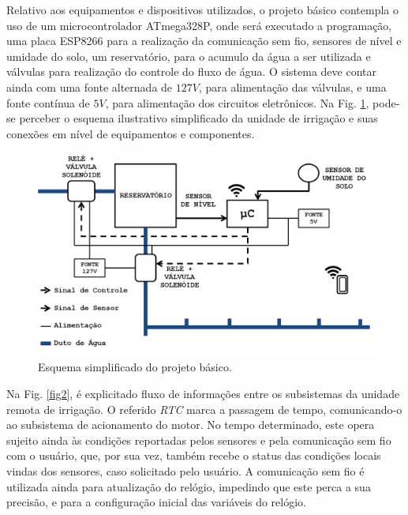 \documentclass[conference]{IEEEtran}
\begin{document}
Relativo aos equipamentos e dispositivos utilizados, o projeto básico contempla o uso de um microcontrolador ATmega328P,  onde será executado a programação, uma placa ESP8266 para a realização da comunicação sem fio, sensores de nível e umidade do solo, um reservatório, para o acumulo da água a ser utilizada e válvulas para realização do controle do fluxo de água. O sistema deve contar ainda com uma fonte alternada de $127 V$, para alimentação das válvulas, e uma fonte contínua de $5 V$, para alimentação dos circuitos eletrônicos. Na Fig. \ref{fig1}, pode-se perceber o esquema ilustrativo simplificado da unidade de irrigação e suas conexões em nível de equipamentos e componentes.

\begin{figure}[htbp]
\centerline{\includegraphics[angle=0, scale=.2]{Img1.png}}
\caption{Esquema simplificado do projeto básico.}
\label{fig1}
\end{figure}

Na Fig. \ref{fig2}, é explicitado fluxo de informações entre os subsistemas da unidade remota de irrigação. O referido \textit{RTC} marca a passagem de tempo, comunicando-o ao subsistema de acionamento do motor. No tempo determinado, este opera sujeito ainda às condições reportadas pelos sensores e pela comunicação sem fio com o usuário, que, por sua vez, também recebe o status das condições locais vindas dos sensores, caso solicitado pelo usuário. A comunicação sem fio é utilizada ainda para atualização do relógio, impedindo que este perca a sua precisão, e para a configuração inicial das variáveis do relógio.
\end{document}
